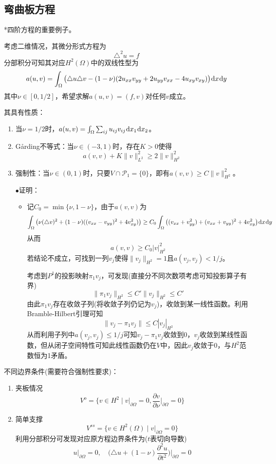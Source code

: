 \documentclass[a4paper,UTF8,fontset=windows]{ctexart}
\newcommand*{\dr}{\hspace{0.07em}\mathrm{d}}
\newcommand*{\cp}{\mathcal{P}}
\newcommand{\proo}[1]{{\kaishu $\bullet$证明：
\begin{itemize}
    \item[] #1
\end{itemize}
}}
\begin{document}
\subsection{弯曲板方程}
*四阶方程的重要例子。

考虑二维情况，其微分形式方程为
$$\triangle^2u=f$$
分部积分可知其对应$H^2(\Omega)$中的双线性型为
$$a(u,v)=\int_\Omega\big(\triangle u\triangle v-(1-\nu)(2u_{xx}v_{yy}+2u_{yy}v_{xx}-4u_{xy}v_{xy})\big)\dr x\dr y$$
其中$\nu\in[0,1/2]$，希望求解$a(u,v)=(f,v)$对任何$v$成立。

其具有性质：
\begin{enumerate}
    \item 当$\nu=1/2$时，$a(u,v)=\int_\Omega\sum_{ij}u_{ij}v_{ij}\dr x_1\dr x_2$。
    \item G\r{a}rding不等式：当$\nu\in(-3,1)$时，存在$K>0$使得
    $$a(v,v)+K\|v\|_{L^2}^2\ge 2\|v\|_{H^2}^2$$
    \item 强制性：当$\nu\in(0,1)$时，只要$V\cap \cp_1=\{0\}$，即有$a(v,v)\ge C\|v\|_{H^2}^2$。
    
    \proo{
        记$C_0=\min\{\nu,1-\nu\}$，由于$a(v,v)$为
        $$\int_\Omega\big(\nu(\triangle v)^2+(1-\nu)((v_{xx}-v_{yy})^2+4v_{xy}^2)\big)\ge C_0\int_\Omega\big((v_{xx}+v_{yy}^2)+(v_{xx}+v_{yy})^2+4v_{xy}^2\big)\dr x\dr y$$
        从而
        $$a(v,v)\ge C_0|v|_{H^2}^2$$
        若结论不成立，可找到一列$v_j$使得$\|v_j\|_{H^2}=1$且$a(v_j,v_j)<1/j$。

        考虑到$P^1$的投影映射$\pi_1v_j$，可发现(直接分不同次数项考虑可知投影算子有界)
        $$\|\pi_1v_j\|_{H^2}\le C'\|v_j\|_{H^2}\le C'$$
        由此$\pi_1v_j$存在收敛子列(将收敛子列仍记为$v_j$)，收敛到某一线性函数。利用Bramble-Hilbert引理可知
        $$\|v_j-\pi_1v_j\|\le C|v_j|_{H^2}$$
        从而利用子列中$a(v_j,v_j)\le 1/j$可知$v_j-\pi_1v_j$收敛到0，$v_j$收敛到某线性函数，但从闭子空间特性可知此线性函数仍在$V$中，因此$v_j$收敛于0，与$H^2$范数恒为1矛盾。
    }
\end{enumerate}

不同边界条件(需要符合强制性要求)：
\begin{enumerate}
    \item 夹板情况
    $$V^o=\bigg\{v\in H^2\mid v\big|_{\partial\Omega}=0,\frac{\partial v}{\partial\nu}\bigg|_{\partial\Omega}=0\bigg\}$$
    \item 简单支撑
    $$V^{ss}=\big\{v\in H^2(\Omega)\mid v\big|_{\partial\Omega}=0\big\}$$
    利用分部积分可发现对应原方程边界条件为($t$表切向导数)
    $$u\big|_{\partial\Omega}=0,\quad\bigg(\triangle u+(1-\nu)\frac{\partial^2u}{\partial t^2}\bigg)\bigg|_{\partial\Omega}=0$$
\end{enumerate}
\end{document}
